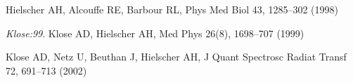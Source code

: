 \documentclass[a4paper,10pt]{article}
\begin{document}
\begin{thebibliography}{9}

Hielscher AH, Alcouffe RE, Barbour RL,
Phys Med Biol 43, 1285--302 (1998)

\textit{Klose:99}. 
Klose AD, Hielscher AH,
Med Phys 26(8), 1698--707 (1999)
 
Klose AD, Netz U, Beuthan J, Hielscher AH,
J Quant Spectrosc Radiat Transf 72, 691--713 (2002)

\end{thebibliography}
\end{document}
